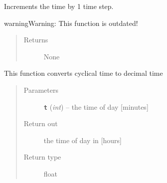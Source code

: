 \documentclass[letterpaper,10pt,english]{sphinxmanual}
\begin{document}
\begin{fulllineitems}

\begin{fulllineitems}
\label{temporal:temporal.Temporal.update_time}
Increments the time by 1 time step.

\begin{notice}{warning}{Warning:}
This function is outdated!
\end{notice}
\begin{quote}\begin{description}
\item[{Returns}] \leavevmode
None

\end{description}\end{quote}

\end{fulllineitems}


\end{fulllineitems}


\begin{fulllineitems}
\label{temporal:temporal.convert_cyclical_to_decimal}
This function converts cyclical time to decimal time
\begin{quote}\begin{description}
\item[{Parameters}] \leavevmode
\textbf{\texttt{t}} (\emph{int}) -- the time of day {[}minutes{]}

\item[{Return out}] \leavevmode
the time of day in {[}hours{]}

\item[{Return type}] \leavevmode
float

\end{description}\end{quote}

\end{fulllineitems}

\end{document}

